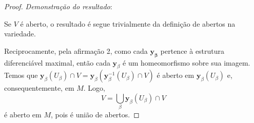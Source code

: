 \begin{proposition}
\begin{proof}
			\emph{Demonstração do resultado}:

			Se $V$ é aberto, o resultado é segue trivialmente da definição de abertos na variedade.

			Reciprocamente, pela afirmação 2, como cada $\mathbf{y_{\beta}}$ pertence à estrutura diferenciável maximal, então cada $\mathbf{y}_{\beta}$ é um homeomorfismo sobre sua imagem. Temos que $\mathbf{y}_{\beta}(U_{\beta})\cap V=\mathbf{y}_{\beta}(\mathbf{y}_{\beta}^{-1}(U_{\beta})\cap V)$ é aberto em $\mathbf{y}_{\beta}(U_{\beta})$ e, consequentemente, em $M$.
			Logo,
			\begin{equation*}
				V=\bigcup_{\beta}\mathbf{y}_{\beta}(U_{\beta})\cap V
			\end{equation*}
			é aberto em $M$, pois é união de abertos.
		\end{proof}
	\end{proposition}
